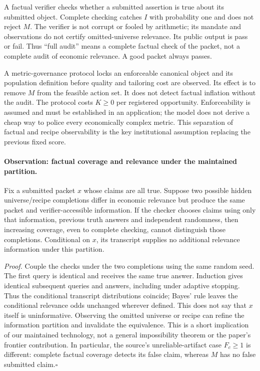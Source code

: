 \documentclass[11pt]{article}
\begin{document}
A factual verifier checks whether a submitted assertion is true about its submitted object. Complete checking catches $I$ with probability one and does not reject $M$. The verifier is not corrupt or fooled by arithmetic; its mandate and observations do not certify omitted-universe relevance. Its public output is pass or fail. Thus ``full audit'' means a complete factual check of the packet, not a complete audit of economic relevance. A good packet always passes.

A metric-governance protocol locks an enforceable canonical object and its population definition before quality and tailoring cost are observed. Its effect is to remove $M$ from the feasible action set. It does not detect factual inflation without the audit. The protocol costs $K\geq0$ per registered opportunity. Enforceability is assumed and must be established in an application; the model does not derive a cheap way to police every economically complex metric. This separation of factual and recipe observability is the key institutional assumption replacing the previous fixed score.
\paragraph{Observation: factual coverage and relevance under the maintained partition.}
Fix a submitted packet $x$ whose claims are all true. Suppose two possible hidden universe/recipe completions differ in economic relevance but produce the same packet and verifier-accessible information. If the checker chooses claims using only that information, previous truth answers and independent randomness, then increasing coverage, even to complete checking, cannot distinguish those completions. Conditional on $x$, its transcript supplies no additional relevance information under this partition.

\emph{Proof.} Couple the checks under the two completions using the same random seed. The first query is identical and receives the same true answer. Induction gives identical subsequent queries and answers, including under adaptive stopping. Thus the conditional transcript distributions coincide; Bayes' rule leaves the conditional relevance odds unchanged wherever defined. This does not say that $x$ itself is uninformative. Observing the omitted universe or recipe can refine the information partition and invalidate the equivalence. This is a short implication of our maintained technology, not a general impossibility theorem or the paper's frontier contribution. In particular, the source's unreliable-artifact case $F_c\geq1$ is different: complete factual coverage detects its false claim, whereas $M$ has no false submitted claim.\hfill$\square$
\end{document}
